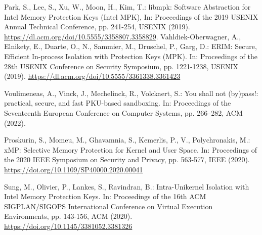 \documentclass[english,sigrecommended,JIP]{ipsj}
\begin{document}
\begin{thebibliography}{99}
    Park, S., Lee, S., Xu, W., Moon, H., Kim, T.: libmpk: Software Abstraction for Intel Memory Protection Keys (Intel MPK),
    In: Proceedings of the 2019 USENIX Annual Technical Conference, pp. 241-254, USENIX (2019). \url{https://dl.acm.org/doi/10.5555/3358807.3358829}.
  Vahldiek-Oberwagner, A., Elnikety, E., Duarte, O., N., Sammier, M., Druschel, P., Garg, D.: ERIM: Secure, Efficient In-process Isolation with Protection Keys (MPK). In: Proceedings of the 28th USENIX Conference on Security Symposium, pp. 1221-1238, USENIX (2019). \url{https://dl.acm.org/doi/10.5555/3361338.3361423}

Voulimeneas, A., Vinck, J., Mechelinck, R., Volckaert, S.: You shall not (by)pass!: practical, secure, and fast PKU-based sandboxing.
In: Proceedings of the Seventeenth European Conference on Computer Systems, pp. 266–282, ACM (2022).


  Proskurin, S., Momeu, M., Ghavamnia, S., Kemerlis, P., V., Polychronakis, M.: xMP: Selective Memory Protection for Kernel and User Space.
  In: Proceedings of the 2020 IEEE Symposium on Security and Privacy, pp. 563-577,  IEEE (2020). \url{https://doi.org/10.1109/SP40000.2020.00041}

  Sung, M., Olivier, P., Lankes, S., Ravindran, B.: Intra-Unikernel Isolation with Intel Memory Protection Keys.
  In: Proceedings of the 16th ACM SIGPLAN/SIGOPS International Conference on Virtual Execution Environments, pp. 143-156, ACM (2020). \url{https://doi.org/10.1145/3381052.3381326}


\end{thebibliography}
\end{document}
